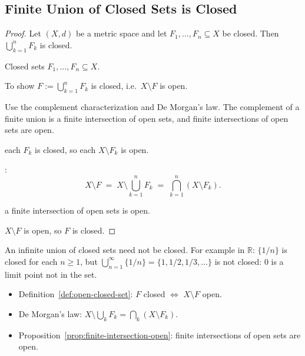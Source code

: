 
\subsection*{Finite Union of Closed Sets is Closed}
\label{prf:finite-union-closed}

\begin{proof}
\Claim Let $(X,d)$ be a metric space and let $F_1, \dots, F_n \subseteq X$ be closed.
Then $\bigcup_{k=1}^n F_k$ is closed.

\Given Closed sets $F_1, \dots, F_n \subseteq X$.

\Goal To show $F := \bigcup_{k=1}^n F_k$ is closed, i.e.\ $X \setminus F$ is open.

\Strategy Use the complement characterization and De Morgan's law.
The complement of a finite union is a finite intersection of open sets,
and finite intersections of open sets are open.

\medskip
\ByAss each $F_k$ is closed, so each $X \setminus F_k$ is open.

:
\[
X \setminus F \;=\; X \setminus \bigcup_{k=1}^n F_k \;=\; \bigcap_{k=1}^n (X \setminus F_k).
\]

 a finite intersection of open sets is open.

\Therefore $X \setminus F$ is open, so $F$ is closed. \AsReq
\end{proof}

\begin{remark*}
An infinite union of closed sets need not be closed.
For example in $\mathbb{R}$: $\{1/n\}$ is closed for each $n \ge 1$,
but $\bigcup_{n=1}^\infty \{1/n\} = \{1, 1/2, 1/3, \ldots\}$
is not closed: $0$ is a limit point not in the set.
\end{remark*}

\begin{remark*}[Dependencies]
\begin{itemize}
  \item Definition~\ref{def:open-closed-set}: $F$ closed $\iff$ $X \setminus F$ open.
  \item De Morgan's law: $X \setminus \bigcup_k F_k = \bigcap_k (X \setminus F_k)$.
  \item Proposition~\ref{prop:finite-intersection-open}: finite intersections of open sets are open.
\end{itemize}
\end{remark*}
